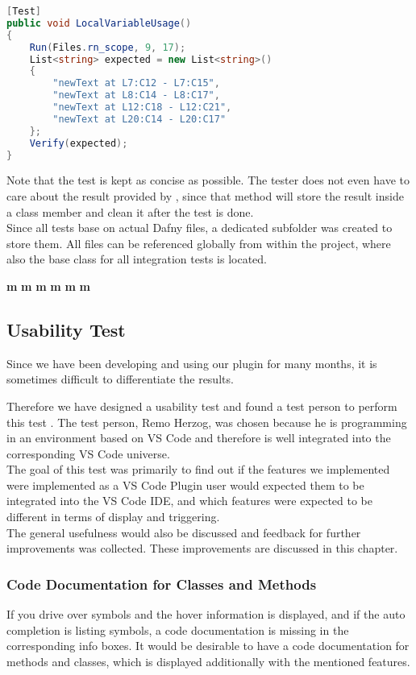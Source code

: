 \begin{lstlisting}[language=csharp, caption={Sample Integration Test}, captionpos=b, label={lst:sampleintegrationtest}]
[Test]
public void LocalVariableUsage()
{
    Run(Files.rn_scope, 9, 17);
    List<string> expected = new List<string>()
    {
        "newText at L7:C12 - L7:C15",
        "newText at L8:C14 - L8:C17",
        "newText at L12:C18 - L12:C21",
        "newText at L20:C14 - L20:C17"
    };
    Verify(expected);
}
\end{lstlisting}

Note that the test is kept as concise as possible.
The tester does not even have to care about the result provided by , since that method will store the result inside a class member and clean it after the test is done.\\

Since all tests base on actual Dafny files, a dedicated subfolder was created to store them.
All files can be referenced globally from within the  project, where also the base class for all integration tests is located.



\textbf{m}
\textbf{m}
\textbf{m}
\textbf{m}
\textbf{m}
\textbf{m}


\subsection{Usability Test}
Since we have been developing and using our plugin for many months,
it is sometimes difficult to differentiate the results.

Therefore we have designed a usability test and found a test person to perform this test \cite{interview-remo}.
The test person, Remo Herzog, was chosen because he is programming in an environment based on VS Code
and therefore is well integrated into the corresponding VS Code universe. \\

The goal of this test was primarily to find out if the features
we implemented were implemented as a VS Code Plugin user would expected them to be integrated into the VS Code IDE,
and which features were expected to be different in terms of display and triggering. \\

The general usefulness would also be discussed and feedback for further improvements was collected.
These improvements are discussed in this chapter.

\subsubsection{Code Documentation for Classes and Methods}
If you drive over symbols and the hover information is displayed,
and if the auto completion is listing symbols,
a code documentation is missing in the corresponding info boxes.
It would be desirable to have a code documentation for methods and classes,
which is displayed additionally with the mentioned features. \\

